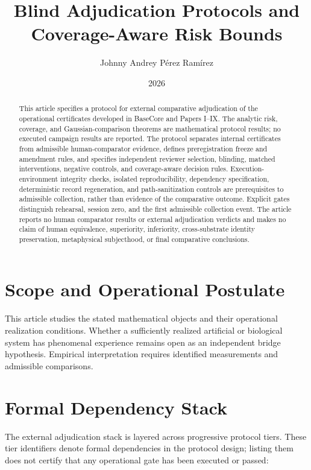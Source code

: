 \documentclass[11pt,a4paper]{article}
\title{\textbf{Blind Adjudication Protocols and Coverage-Aware Risk Bounds}}
\author{Johnny Andrey P\'erez Ram\'irez}
\date{2026}
\begin{document}
\setlength{\emergencystretch}{3em}
\maketitle

\begin{abstract}
This article specifies a protocol for external comparative adjudication of
the operational certificates developed in BaseCore and Papers I--IX.
The analytic risk, coverage, and Gaussian-comparison theorems are mathematical
protocol results; no executed campaign results are reported. The protocol
separates internal certificates from admissible human-comparator evidence,
defines preregistration freeze and amendment rules, and specifies independent
reviewer selection, blinding, matched interventions, negative controls, and
coverage-aware decision rules. Execution-environment integrity checks, isolated reproducibility,
dependency specification, deterministic record regeneration, and path-sanitization
controls are prerequisites to admissible collection, rather than evidence of
the comparative outcome. Explicit gates distinguish rehearsal, session zero,
and the first admissible collection event. The article reports no human
comparator results or external adjudication verdicts and makes no claim of
human equivalence, superiority, inferiority, cross-substrate identity
preservation, metaphysical subjecthood, or final comparative conclusions.
\end{abstract}

\tableofcontents

\section*{Scope and Operational Postulate}
This article studies the stated mathematical objects and their operational
realization conditions. Whether a sufficiently realized artificial or biological
system has phenomenal experience remains open as an independent bridge
hypothesis. Empirical interpretation requires identified measurements and
admissible comparisons.

\section{Formal Dependency Stack}

The external adjudication stack is layered across progressive protocol tiers. These tier identifiers denote formal dependencies in the protocol design; listing them does not certify that any operational gate has been executed or passed:
\end{document}
